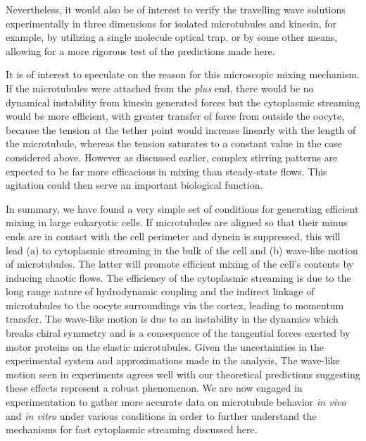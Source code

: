 \documentclass[11pt]{ucthesis}
\begin{document}
{Nevertheless, it would also be of interest to verify the travelling wave solutions experimentally
in three dimensions for isolated
microtubules and kinesin, for example, by utilizing a single molecule optical trap, or by some other
means, allowing for a more rigorous test of the predictions made here.


It is of interest to speculate on the reason for this microscopic mixing
mechanism.  If the microtubules were attached from the {\em plus} end,
there would be no dynamical instability from kinesin generated forces
but the cytoplasmic streaming would be more efficient, with greater transfer
of force from outside the oocyte, because the tension at the
tether point would increase linearly with the length of the microtubule,
whereas the tension saturates to a constant value in the case considered
above. However as discussed earlier, complex stirring patterns are
expected to be far more efficacious in mixing than steady-state flows.
This agitation could then serve an important biological function.


In summary, we have found a very simple set of conditions for generating efficient mixing
in large eukaryotic cells. If microtubules are aligned so that their minus ends
are in contact with the cell perimeter and dynein is suppressed, this will lead 
(a) to cytoplasmic streaming in the bulk of the cell and (b) wave-like motion of
microtubules. The latter will promote efficient mixing of the cell's contents by
inducing chaotic flows.
The efficiency of the cytoplasmic streaming is due to the long range nature of
hydrodynamic coupling and the indirect linkage of microtubules to the oocyte surroundings via the cortex, leading to momentum transfer.
The wave-like motion is due to an instability in the dynamics which breaks chiral
symmetry and is a consequence of the tangential forces exerted by motor proteins on the elastic
microtubules. Given the uncertainties in the experimental system and approximations
made in the analysis, The wave-like motion seen in experiments agrees well with our theoretical predictions
suggesting these effects represent a robust phenomenon.
We are now engaged in experimentation to gather more accurate data on microtubule behavior 
{\em in vivo} and {\em in vitro} under various conditions in order to further understand
the mechanisms for fast cytoplasmic streaming discussed here.





}
\end{document}
